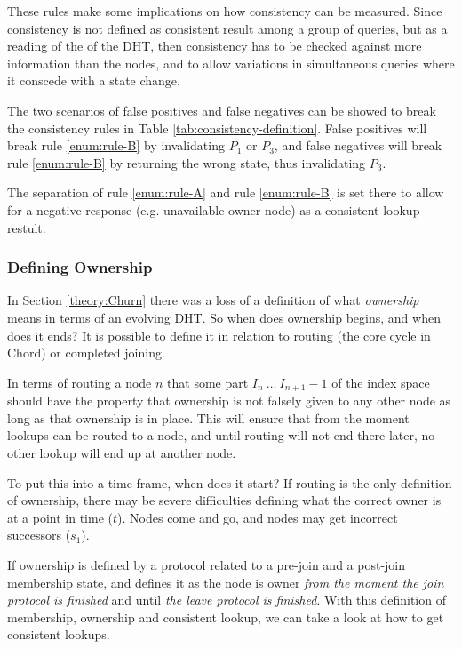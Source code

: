 These rules make some implications on how consistency
 can be measured. Since consistency is not defined as consistent result among a group
 of queries, but as a reading of the  of the DHT,
 then consistency has to be checked against
 more information than the nodes, and to allow variations in simultaneous queries
 where it conscede with a state change.

The two scenarios of false positives and false negatives can be showed to
 break the consistency rules in Table \ref{tab:consistency-definition}. False positives
 will break rule \ref{enum:rule-B} by invalidating $P_1$ or $P_3$, and false negatives will break
 rule \ref{enum:rule-B} by returning the wrong state, thus invalidating $P_3$.

The separation of rule \ref{enum:rule-A} and rule \ref{enum:rule-B} is set
 there to allow for a negative response (e.g. unavailable owner node)
 as a consistent lookup restult.

\subsubsection{Defining Ownership}

In Section \ref{theory:Churn} there was a loss of a definition of what
 \emph{ownership} means in terms of an evolving DHT. So when does ownership
 begins, and when does it ends? It is possible to define it in relation
 to routing (the core cycle in Chord) or completed joining.

In terms of routing a node $n$ that  some part
 $I_{n}\ \ldots\ I_{n+1}-1$ of the index space should have the property that
 ownership is not falsely given to any other node as long as that ownership
 is in place. This will ensure that from the moment lookups can be routed
 to a node, and until routing will not end there later, no other lookup will
 end up at another node.

To put this into a time frame, when does it start? If routing is the only
 definition of ownership, there may be severe difficulties defining what
 the correct owner is at a point in time ($t$). Nodes come and go, and nodes
 may get incorrect successors ($s_1$).

If ownership is defined by a  protocol related to a
 pre-join and a post-join membership state, and defines it
 as the node is owner \emph{from the moment the join protocol is finished} and until
 \emph{the leave protocol is finished}. With this definition of membership, ownership
 and consistent lookup, we can take a look at how to get consistent lookups.

